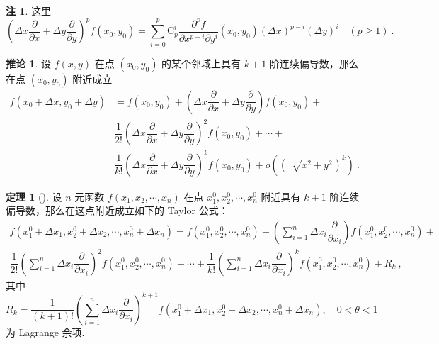 \documentclass[zihao=-4,linespread=1.8,UTF8,nothm]{aytony_base}
\theoremstyle{definition}
\newtheorem{theorem}{\indent\heiti\textbf{定理}}[subsection]
\newtheorem*{corollary}{\indent\heiti\textbf{推论}}
\newtheorem*{remark*}{\indent\heiti\textbf{注}}
\begin{document}
\begin{remark*}
    这里 $$
        \left(\Delta x \dfrac{\partial }{\partial x} + \Delta y \dfrac{\partial }{\partial y}\right)^pf(x_0, y_0) = \sum\limits_{i = 0}^{p}\mathrm{C}_p^i \dfrac{\partial ^pf}{\partial x^{p-i}\partial y^i}(x_0, y_0)(\Delta x)^{p-i}(\Delta y)^i\quad (p \geqslant 1)\ .
    $$
\end{remark*}

\begin{corollary}
    设 $f(x, y)$ 在点 $(x_0, y_0)$ 的某个邻域上具有 $k + 1$ 阶连续偏导数，那么在点 $(x_0, y_0)$ 附近成立 $$
        \begin{aligned}
            f(x_0 + \Delta x, y_0 + \Delta y) & = f(x_0, y_0) + \left(\Delta x \dfrac{\partial }{\partial x} + \Delta y \dfrac{\partial }{\partial y}\right)f(x_0, y_0) +                               \\
                                              & \dfrac{1}{2!}\left(\Delta x \dfrac{\partial }{\partial x} + \Delta y \dfrac{\partial }{\partial y}\right)^2f(x_0, y_0) + \cdots +                       \\
                                              & \dfrac{1}{k!}\left(\Delta x \dfrac{\partial }{\partial x} + \Delta y \dfrac{\partial }{\partial y}\right)^kf(x_0, y_0) + o((\,\sqrt[]{x^2 + y^2})^k)\ .
        \end{aligned}
    $$
\end{corollary}

\begin{theorem}[]
    设 $n$ 元函数 $f({x}_1, {x}_2, \cdots, {x}_{n})$ 在点 $x^0_1, x^0_2, \cdots, x^0_{n}$ 附近具有 $k + 1$ 阶连续偏导数，那么在这点附近成立如下的 Taylor 公式：$$
        \begin{aligned}
            f(x^0_1 + \Delta x_1, x^0_2 + \Delta x_2, \cdots, x^0_{n} + \Delta x_n)\! =\! f(x^0_1, x^0_2, \cdots, x^0_{n}) + \left(\sum\limits_{i = 1}^{n}\Delta x_i \dfrac{\partial }{\partial x_i}\right)f(x^0_1, x^0_2, \cdots, x^0_{n}) + \\\dfrac{1}{2!}\left(\sum\limits_{i = 1}^{n}\Delta x_i \dfrac{\partial }{\partial x_i}\right)^2f(x^0_1, x^0_2, \cdots, x^0_{n}) + \cdots + \dfrac{1}{k!}\left(\sum\limits_{i = 1}^{n}\Delta x_i \dfrac{\partial }{\partial x_i}\right)^kf(x^0_1, x^0_2, \cdots, x^0_{n}) + R_k\ ,
        \end{aligned}$$ 其中 $$
        R_k = \dfrac{1}{(k+1)!}\left(\sum\limits_{i = 1}^{n}\Delta x_i \dfrac{\partial }{\partial x_i}\right)^{k+1}f(x^0_1 + \Delta x_1, x^0_2 + \Delta x_2, \cdots, x^0_{n} + \Delta x_n),\quad 0 < \theta < 1
    $$ 为 Lagrange 余项.
\end{theorem}
\end{document}
